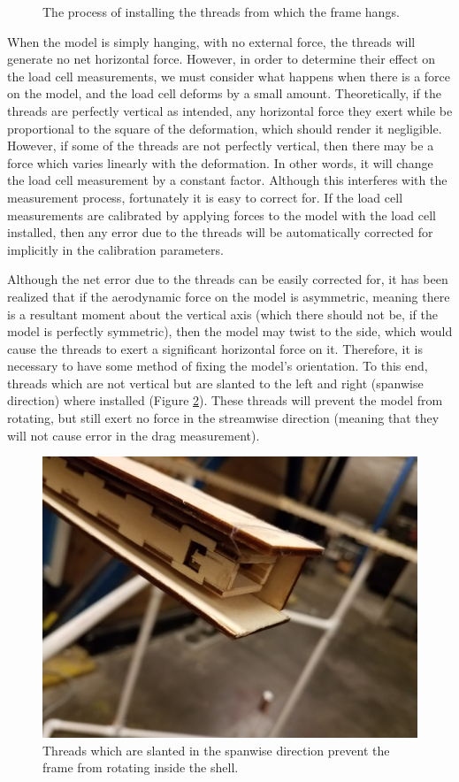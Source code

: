 \documentclass[12pt]{report} %
\begin{document}
\begin{figure}
\centering
\caption{The process of installing the threads from which the frame hangs.}
\label{thread_insertion}
\end{figure}

When the model is simply hanging, with no external force, the threads will generate no net horizontal force. However, in order
to determine their effect on the load cell measurements, we must consider what happens when there is a force on the model, and
the load cell deforms by a small amount. Theoretically, if the threads are perfectly vertical as intended, any horizontal force
they exert while be proportional to the square of the deformation, which should render it negligible. However, if some of the
threads are not perfectly vertical, then there may be a force which varies linearly with the deformation. In other words, it
will change the load cell measurement by a constant factor. Although this interferes with the measurement process, fortunately
it is easy to correct for. If the load cell measurements are calibrated by applying forces to the model with the load cell installed,
then any error due to the threads will be automatically corrected for implicitly in the calibration parameters.

Although the net error due to the threads can be easily corrected for, it has been realized that if the aerodynamic force on the
model is asymmetric, meaning there is a resultant moment about the vertical axis (which there should not be, if the model is
perfectly symmetric), then the model may twist to the side, which would cause the threads to exert a significant horizontal
force on it. Therefore, it is necessary to have some method of fixing the model's orientation. To this end, threads which
are not vertical but are slanted to the left and right (spanwise direction) where installed (Figure \ref{side_thread}). These
threads will prevent the model from rotating, but still exert no force in the streamwise direction (meaning that they will not
cause error in the drag measurement).

\begin{figure}
\includegraphics[angle=180,origin=c,width = 0.7\linewidth]{side_force.jpg}
\centering
\caption{Threads which are slanted in the spanwise direction prevent the frame from rotating inside the shell.}
\label{side_thread}
\end{figure}
\end{document}
